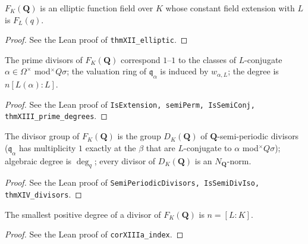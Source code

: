 \begin{theorem}
\label{thm:XII}
\leanok
$F_K(\mathbf Q)$ is an elliptic function field over $K$ whose constant field extension with $L$ is $F_L(q)$.
\end{theorem}
\begin{proof}
\leanok
See the Lean proof of \texttt{thmXII\_elliptic}.
\end{proof}

\begin{theorem}
\label{thm:XIII}
\leanok
The prime divisors of $F_K(\mathbf Q)$ correspond $1$--$1$ to the classes of $L$-conjugate $\alpha\in\Omega^\times$ mod$^\times Q\sigma$; the valuation ring of $\mathfrak q_\alpha$ is induced by $w_{\alpha,L}$; the degree is $n[L(\alpha):L]$.
\end{theorem}
\begin{proof}
\leanok
See the Lean proof of \texttt{IsExtension, semiPerm, IsSemiConj, thmXIII\_prime\_degrees}.
\end{proof}

\begin{theorem}
\label{thm:XIV}
\leanok
The divisor group of $F_K(\mathbf Q)$ is the group $D_K(\mathbf Q)$ of $\mathbf Q$-semi-periodic divisors ($\mathfrak q_\alpha$ has multiplicity $1$ exactly at the $\beta$ that are $L$-conjugate to $\alpha$ mod$^\times Q\sigma$); algebraic degree is $\deg_q$; every divisor of $D_K(\mathbf Q)$ is an $N_{\mathbf Q}$-norm.
\end{theorem}
\begin{proof}
\leanok
See the Lean proof of \texttt{SemiPeriodicDivisors, IsSemiDivIso, thmXIV\_divisors}.
\end{proof}

\begin{corollary}
\label{cor:XIIIa}
\leanok
The smallest positive degree of a divisor of $F_K(\mathbf Q)$ is $n=[L:K]$.
\end{corollary}
\begin{proof}
\leanok
See the Lean proof of \texttt{corXIIIa\_index}.
\end{proof}

